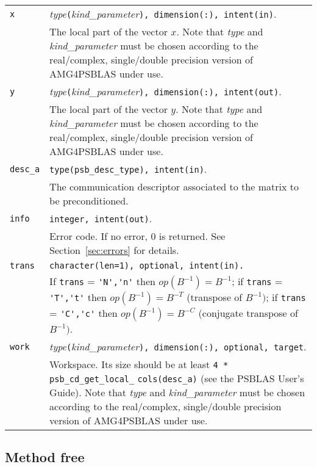 \begin{tabular}{p{1.2cm}p{12cm}}
\verb|x|      & \emph{type}\verb|(|\emph{kind\_parameter}\verb|), dimension(:), intent(in)|.\\
              & The local part of the vector $x$. Note that \emph{type} and
                \emph{kind\_parameter} must be chosen according
                to the real/complex, single/double precision version of AMG4PSBLAS under use.\\
\verb|y|      & \emph{type}\verb|(|\emph{kind\_parameter}\verb|), dimension(:), intent(out)|.\\
              & The local part of the vector $y$. Note that \emph{type} and
                \emph{kind\_parameter} must be chosen according
                to the real/complex, single/double precision version of AMG4PSBLAS under use.\\
\verb|desc_a| & \verb|type(psb_desc_type), intent(in)|. \\
              & The communication descriptor associated to the matrix to be
                preconditioned.\\
\verb|info|   & \verb|integer, intent(out)|.\\
              & Error code. If no error, 0 is returned. See Section~\ref{sec:errors} for details.\\
\verb|trans|  & \verb|character(len=1), optional, intent(in).|\\
              & If \verb|trans| = \verb|'N','n'| then $op(B^{-1}) = B^{-1}$;
                if \verb|trans| = \verb|'T','t'| then $op(B^{-1}) = B^{-T}$
                (transpose of $B^{-1})$;  if \verb|trans| = \verb|'C','c'| then $op(B^{-1}) = B^{-C}$
                (conjugate transpose of $B^{-1})$.\\
\verb|work|  & \emph{type}\verb|(|\emph{kind\_parameter}\verb|), dimension(:), optional, target|.\\
             & Workspace. Its size should be at
               least \verb|4 * psb_cd_get_local_| \verb|cols(desc_a)| (see the PSBLAS User's Guide).
               Note that \emph{type} and \emph{kind\_parameter} must be chosen according
               to the real/complex, single/double precision version of AMG4PSBLAS under use.\\
\end{tabular}


\clearpage

\subsection{Method free\label{sec:precfree}}

